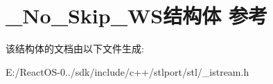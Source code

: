 \hypertarget{struct___no___skip___w_s}{}\section{\+\_\+\+No\+\_\+\+Skip\+\_\+\+W\+S结构体 参考}
\label{struct___no___skip___w_s}


该结构体的文档由以下文件生成\+:\begin{DoxyCompactItemize}
\item 
E\+:/\+React\+O\+S-\/0../sdk/include/c++/stlport/stl/\+\_\+istream.\+h\end{DoxyCompactItemize}
